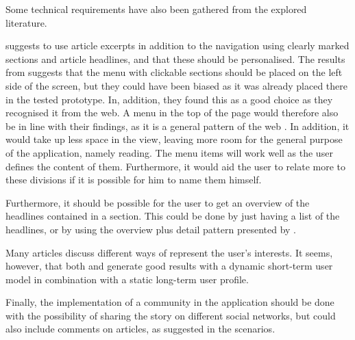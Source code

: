 Some technical requirements have also been gathered from the explored literature.

\cite{fulltext.pdf} suggests to use article excerpts in addition to the navigation using clearly marked sections and article headlines, and that these should be personalised. The results from \cite{kristin_fredrik.pdf} suggests that the menu with clickable sections should be placed on the left side of the screen, but they could have been biased as it was already placed there in the tested prototype. In, addition, they found this as a good choice as they recognised it from the web. A menu in the top of the page would therefore also be in line with their findings, as it is a general pattern of the web \cite{Tidwell}. In addition, it would take up less space in the view, leaving more room for the general purpose of the application, namely reading. The menu items will work well as the user defines the content of them. Furthermore, it would aid the user to relate more to these divisions if it is possible for him to name them himself.

Furthermore, it should be possible for the user to get an overview of the headlines contained in a section. This could be done by just having a list of the headlines, or by using the overview plus detail pattern presented by \cite{Tidwell}.

Many articles discuss different ways of represent the user's interests. It seems, however, that both \cite{fulltext.pdf} and \cite{User-Modeling-for-Adaptive-News-Access.pdf} generate good results with a dynamic short-term user model in combination with a static long-term user profile.


Finally, the implementation of a community in the application should be done with the possibility of sharing the story on different social networks, but could also include comments on articles, as suggested in the scenarios.

